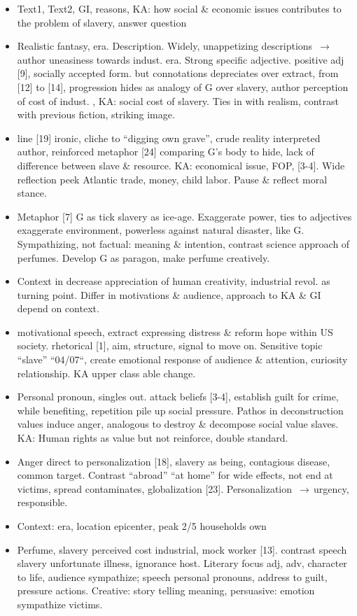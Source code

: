 \documentclass[a4paper,12pt]{article}
\newcommand{\arr}{$\,\to\,$}
\begin{document}
\begin{itemize}
 \item Text1, Text2, GI, reasons, KA: how social \& economic issues contributes to the problem of slavery, answer question
 \item Realistic fantasy, era. Description. Widely, unappetizing descriptions \arr author uneasiness towards indust. era.
 Strong specific adjective. positive adj [9], socially accepted form. but connotations depreciates over extract, from [12] to [14], progression hides as analogy of G over slavery, author perception of cost of indust. , KA: social cost of slavery. Ties in with realism, contrast with previous fiction, striking image.
 \item line [19] ironic, cliche to ``digging own grave'', crude reality interpreted author, reinforced metaphor [24] comparing G's body to hide, lack of difference between slave \& resource. KA: economical issue, FOP, [3-4]. Wide reflection peek Atlantic trade, money, child labor. Pause \& reflect moral stance.
 \item Metaphor [7] G as tick slavery as ice-age. Exaggerate power, ties to adjectives exaggerate environment, powerless against natural disaster, like G. Sympathizing, not factual: meaning \& intention, contrast science approach of perfumes. Develop G as paragon, make perfume creatively.
 \item Context in decrease appreciation of human creativity, industrial revol. as turning point. Differ in motivations \& audience, approach to KA \& GI depend on context.

 \item motivational speech, extract expressing distress \& reform hope within US society. rhetorical [1], aim, structure, signal to move on. Sensitive topic ``slave'' ``04/07``, create emotional response of audience \& attention, curiosity relationship. KA upper class able change.
 \item Personal pronoun, singles out. attack beliefs [3-4], establish guilt for crime, while benefiting, repetition pile up social pressure. Pathos in deconstruction values induce anger, analogous to destroy \& decompose social value slaves. KA: Human rights as value but not reinforce, double standard.
 \item Anger direct to personalization [18], slavery as being, contagious disease, common target. Contrast ``abroad'' ``at home'' for wide effects, not end at victims, spread  contaminates, globalization [23]. Personalization \arr urgency, responsible.
 \item Context: era, location epicenter, peak 2/5 households own

 \item Perfume, slavery perceived cost industrial, mock worker [13]. contrast speech slavery unfortunate illness, ignorance host. Literary focus adj, adv, character to life, audience sympathize; speech personal pronouns, address to guilt, pressure actions. Creative: story telling meaning, persuasive: emotion sympathize victims.
\end{itemize}
\end{document}
